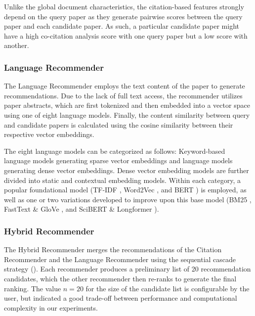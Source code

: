 Unlike the global document characteristics, the citation-based features strongly depend on the query paper as they generate pairwise scores between the query paper and each candidate paper. As such, a particular candidate paper might have a high co-citation analysis score with one query paper but a low score with another.


\subsubsection{Language Recommender}

The Language Recommender employs the text content of the paper to generate recommendations.
Due to the lack of full text access, the recommender utilizes paper abstracts, which are first tokenized and then embedded into a vector space using one of eight language models.
Finally, the content similarity between query and candidate papers is calculated using the cosine similarity between their respective vector embeddings.

The eight language models can be categorized as follows: Keyword-based language models generating sparse vector embeddings and language models generating dense vector embeddings.
Dense vector embedding models are further divided into static and contextual embedding models.
Within each category, a popular foundational model (TF-IDF \cite{SaltonTermWeighting1987}, Word2Vec \cite{MikolovEfficientEstimation2013}, and BERT \cite{DevlinBERTPretraining2019}) is employed, as well as one or two variations developed to improve upon this base model (BM25 \cite{RobertsonOkapiTREC31995}, FastText \cite{BojanowskiEnrichingWord2017} \& GloVe \cite{PenningtonGloveGlobal2014}, and SciBERT \cite{BeltagySciBERTPretrained2019} \& Longformer \cite{BeltagyLongformerLongDocument2020}).


\subsubsection{Hybrid Recommender}

The Hybrid Recommender merges the recommendations of the Citation Recommender and the Language Recommender using the sequential cascade strategy ().
Each recommender produces a preliminary list of 20 recommendation candidates, which the other recommender then re-ranks to generate the final ranking.
The value $n=20$ for the size of the candidate list is configurable by the user, but indicated a good trade-off between performance and computational complexity in our experiments.

